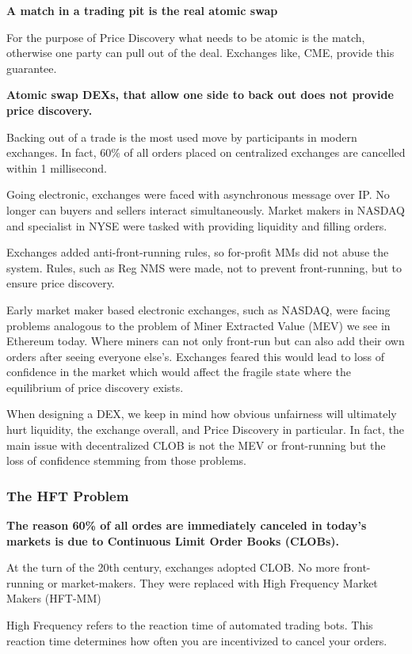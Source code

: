 \documentclass[12pt]{article}
\begin{document}
\textbf{A match in a trading pit is the real atomic swap} 

For the purpose of Price Discovery what needs to be atomic is the match, otherwise one party can pull out of the deal. Exchanges like, CME, provide this guarantee. 

\textbf{Atomic swap DEXs, that allow one side to back out does not provide price discovery.}

Backing out of a trade is the most used move by participants in modern exchanges. In fact, 60\%  of all orders placed on centralized exchanges are cancelled within 1 millisecond. \cite{notsure}  

Going electronic, exchanges were faced with asynchronous message over IP. No longer can buyers and sellers interact simultaneously. Market makers in NASDAQ and specialist in NYSE were tasked with providing liquidity and filling orders. 

Exchanges added anti-front-running rules, so for-profit MMs did not abuse the system. Rules, such as Reg NMS were made, not to prevent front-running, but to ensure price discovery. \cite{notsure} 

Early market maker based electronic exchanges, such as NASDAQ, were facing problems analogous to the problem of Miner Extracted Value (MEV) we see in Ethereum today. Where miners can not only front-run but can also add their own orders after seeing everyone else's. Exchanges feared this would lead to loss of confidence in the market which would affect the fragile state where the equilibrium of price discovery exists. 

When designing a DEX, we keep in mind how obvious unfairness will ultimately hurt liquidity, the exchange overall, and Price Discovery in particular. In fact, the main issue with decentralized CLOB is not the MEV or front-running but the loss of confidence stemming from those problems.  


\subsubsection*{The HFT Problem}
\textbf{The reason 60\% of all ordes are immediately canceled in today's markets is due to Continuous Limit Order Books (CLOBs).}

At the turn of the 20th century, exchanges adopted CLOB. No more front-running or market-makers. They were replaced with High Frequency Market Makers (HFT-MM) 

High Frequency refers to the reaction time of automated trading bots. This reaction time determines how often you are incentivized to cancel your orders. 
\end{document}
